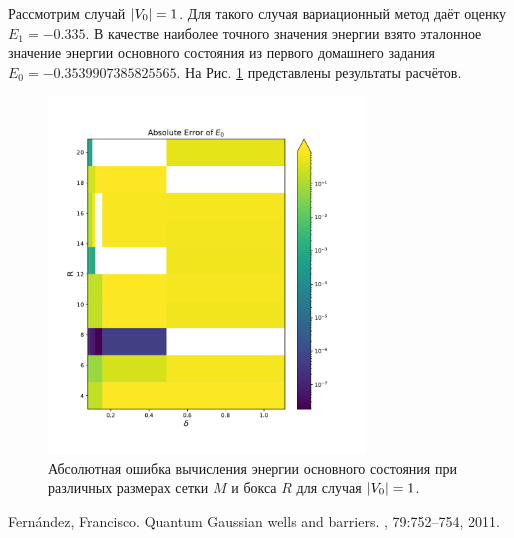 \documentclass[10pt]{article}
\begin{document}
Рассмотрим случай $\abs{V_0}=1$. Для такого случая вариационный метод даёт оценку $E_1 = -0.335$. В качестве наиболее точного значения энергии взято эталонное значение энергии основного состояния из первого домашнего задания $E_0 = -0.3539907385825565$. На Рис. \ref{fig:abserr} представлены результаты расчётов.
\begin{figure}[htbp]
    \centering
    \includegraphics[width=0.75\textwidth]{../figures/abserr}
    \caption{Абсолютная ошибка вычисления энергии основного состояния при различных размерах сетки $M$ и бокса $R$ для случая $\abs{V_0}=1$.}
    \label{fig:abserr}
\end{figure}



\begin{thebibliography}{10}
    Fernández, Francisco.
    \newblock Quantum Gaussian wells and barriers.
    , 79:752--754, 2011.
\end{thebibliography}
\end{document}
